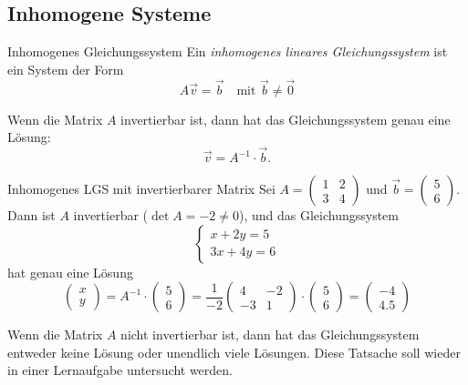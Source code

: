 \subsection{Inhomogene Systeme}
\label{sec:InhomogeneSysteme}
\begin{definition}{Inhomogenes Gleichungssystem}{}
Ein \emph{inhomogenes lineares Gleichungssystem} ist ein System der Form
\[
A\vec{v} = \vec{b} \quad \text{mit } \vec{b} \neq \vec{0}
\]
\end{definition}
Wenn die Matrix $A$ invertierbar ist, dann hat das Gleichungssystem genau eine Lösung:
\[
\vec{v} = A^{-1}\cdot \vec{b}.\]
\begin{bsp}
{Inhomogenes LGS mit invertierbarer Matrix}{}
Sei $A = \begin{pmatrix} 1 & 2 \\ 3 & 4 \end{pmatrix}$ und $\vec{b} = \begin{pmatrix} 5 \\ 6 \end{pmatrix}$. Dann ist $A$ invertierbar ($\det A = -2 \neq0$), und das Gleichungssystem
\[
\begin{cases}
x+2y = 5 \\
3x+4y = 6
\end{cases}
\]
hat genau eine Lösung $$\begin{pmatrix}
    x \\ y
\end{pmatrix} = A^{-1} \cdot \begin{pmatrix}
    5 \\ 6
\end{pmatrix} = \frac{1}{-2} \begin{pmatrix}
    4 & -2 \\ -3 & 1
\end{pmatrix}\cdot \begin{pmatrix}
    5 \\ 6
\end{pmatrix} = \begin{pmatrix} -4 \\ 4.5 \end{pmatrix}$$
\end{bsp}

Wenn die Matrix $A$ nicht invertierbar ist, dann hat das Gleichungssystem entweder keine Lösung oder unendlich viele Lösungen. Diese Tatsache soll wieder in einer Lernaufgabe untersucht werden.

